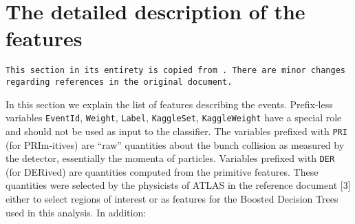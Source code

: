 \section{The detailed description of the features}\label{app:data}


\texttt{This section in its entirety is copied from \cite{higgsPaper}. There are minor changes regarding references in the original document.}

In this section we explain the list of features describing the events.
Prefix-less variables \texttt{EventId}, \texttt{Weight}, \texttt{Label}, \texttt{KaggleSet}, \texttt{KaggleWeight} have a special role and should not be used as input to the classifier. The variables prefixed with \texttt{PRI} (for PRIm-itives) are “raw” quantities about the bunch collision as measured by the detector, essentially the momenta of particles. Variables prefixed with \texttt{DER} (for DERived) are quantities computed from the primitive features. These quantities were selected by the physicists of ATLAS in the reference document [3] either to select regions of interest or as features for the Boosted Decision Trees used in this analysis. In addition:

%
\pagebreak

	{\pagebreak \thispagestyle{empty} \cleardoublepage}{\clearpage}